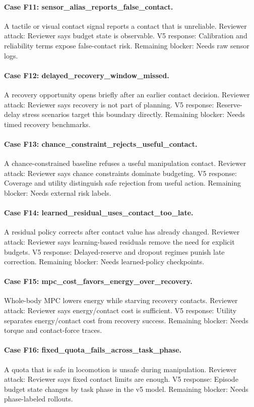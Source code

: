 \documentclass{article}
\begin{document}
\paragraph{Case F11: sensor\_alias\_reports\_false\_contact.} A tactile or visual contact signal reports a contact that is unreliable. Reviewer attack: Reviewer says budget state is observable. V5 response: Calibration and reliability terms expose false-contact risk. Remaining blocker: Needs raw sensor logs.
\paragraph{Case F12: delayed\_recovery\_window\_missed.} A recovery opportunity opens briefly after an earlier contact decision. Reviewer attack: Reviewer says recovery is not part of planning. V5 response: Reserve-delay stress scenarios target this boundary directly. Remaining blocker: Needs timed recovery benchmarks.
\paragraph{Case F13: chance\_constraint\_rejects\_useful\_contact.} A chance-constrained baseline refuses a useful manipulation contact. Reviewer attack: Reviewer says chance constraints dominate budgeting. V5 response: Coverage and utility distinguish safe rejection from useful action. Remaining blocker: Needs external risk labels.
\paragraph{Case F14: learned\_residual\_uses\_contact\_too\_late.} A residual policy corrects after contact value has already changed. Reviewer attack: Reviewer says learning-based residuals remove the need for explicit budgets. V5 response: Delayed-reserve and dropout regimes punish late correction. Remaining blocker: Needs learned-policy checkpoints.
\paragraph{Case F15: mpc\_cost\_favors\_energy\_over\_recovery.} Whole-body MPC lowers energy while starving recovery contacts. Reviewer attack: Reviewer says energy/contact cost is sufficient. V5 response: Utility separates energy/contact cost from recovery success. Remaining blocker: Needs torque and contact-force traces.
\paragraph{Case F16: fixed\_quota\_fails\_across\_task\_phase.} A quota that is safe in locomotion is unsafe during manipulation. Reviewer attack: Reviewer says fixed contact limits are enough. V5 response: Episode budget state changes by task phase in the v5 model. Remaining blocker: Needs phase-labeled rollouts.
\end{document}

